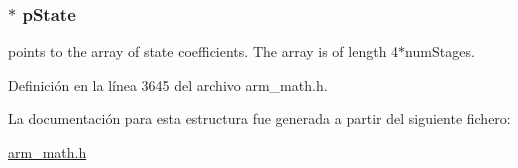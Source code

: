 \subsubsection[{\texorpdfstring{p\+State}{pState}}]{$\ast$ p\+State}\hypertarget{structarm__biquad__cas__df1__32x64__ins__q31_adefeb77301cc04e4d7d22f323029d588}{}\label{structarm__biquad__cas__df1__32x64__ins__q31_adefeb77301cc04e4d7d22f323029d588}
points to the array of state coefficients. The array is of length 4$\ast$num\+Stages. 

Definición en la línea 3645 del archivo arm\+\_\+math.\+h.



La documentación para esta estructura fue generada a partir del siguiente fichero\+:\begin{DoxyCompactItemize}
\item 
\hyperlink{arm__math_8h}{arm\+\_\+math.\+h}\end{DoxyCompactItemize}
